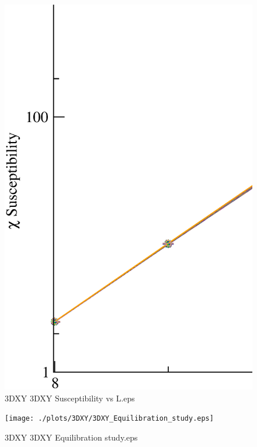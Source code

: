 \begin{figure}[!htpb]
  \centering
  \includegraphics[width=\textwidth]{./plots/3DXY/3DXY_Susceptibility_vs_L.eps}
  \caption{3DXY 3DXY Susceptibility vs L.eps}
\end{figure}

\begin{figure}[!htpb]
  \centering
  \texttt{[image: ./plots/3DXY/3DXY\_Equilibration\_study.eps]}
  \caption{3DXY 3DXY Equilibration study.eps}
\end{figure}

